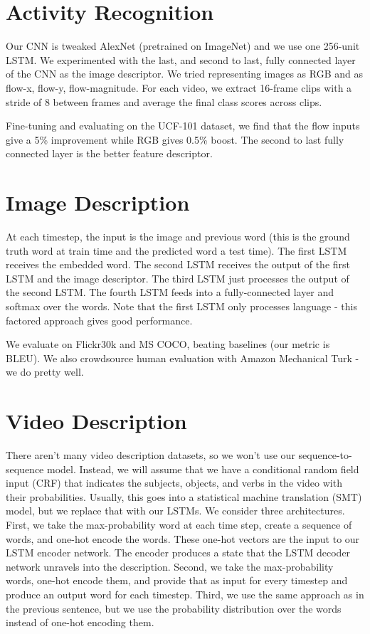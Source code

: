 \documentclass[a4paper]{article}
\begin{document}
\section{Activity Recognition}
Our CNN is tweaked AlexNet (pretrained on ImageNet) and we use one 256-unit
LSTM. We experimented
with the last, and second to last, fully connected layer of the CNN as the
image descriptor. We tried representing images as RGB and as flow-x, flow-y,
flow-magnitude. For each video, we extract 16-frame clips with a stride of 8
between frames and average the final class scores across clips.

Fine-tuning and evaluating on the UCF-101 dataset, we find that the flow
inputs give a 5\% improvement while RGB gives 0.5\% boost. The second to last
fully connected layer is the better feature descriptor.

\section{Image Description}
At each timestep, the input is the image and previous word (this is the
ground truth word at train time and the predicted word a test time). The first
LSTM receives the embedded word. The second LSTM receives the output of the
first LSTM and the image descriptor. The third LSTM just processes the output
of the second LSTM. The fourth LSTM feeds into a fully-connected layer and
softmax over the words. Note that the first LSTM only processes language -
this factored approach gives good performance.

We evaluate on Flickr30k and MS COCO, beating baselines (our metric is BLEU).
We also crowdsource human evaluation with Amazon Mechanical Turk - we do pretty
well.

\section{Video Description}
There aren't many video description datasets, so we won't use our sequence-to-
sequence model. Instead, we will assume that we have a conditional random
field input (CRF) that indicates the subjects, objects, and verbs in the video
with their probabilities. Usually, this goes into a statistical machine
translation (SMT) model, but we replace that with our LSTMs. We consider
three architectures. First, we take the max-probability word at each time step,
create a sequence of words, and one-hot encode the words. These one-hot
vectors are the input to our LSTM encoder network. The encoder produces a
state that the LSTM decoder network unravels into the description. Second,
we take the max-probability words, one-hot encode them, and provide that as
input for every timestep and produce an output word for each timestep.
Third, we use the same approach as in the previous sentence, but we use the
probability distribution over the words instead of one-hot encoding them.
\end{document}
